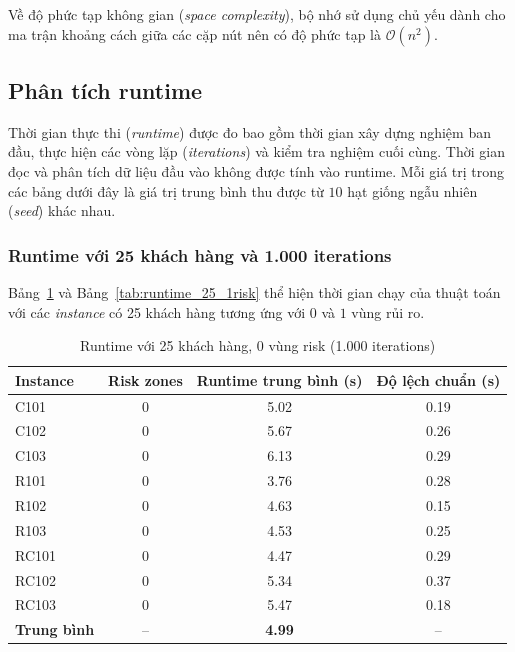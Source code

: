 \documentclass{article}
\begin{document}
Về độ phức tạp không gian (\textit{space complexity}), bộ nhớ sử dụng chủ yếu dành cho ma trận khoảng cách giữa các cặp nút nên có độ phức tạp là $\mathcal{O}(n^2)$.
\subsection{Phân tích runtime}

Thời gian thực thi (\textit{runtime}) được đo bao gồm thời gian xây dựng nghiệm ban đầu, thực hiện các vòng lặp (\textit{iterations}) và kiểm tra nghiệm cuối cùng. Thời gian đọc và phân tích dữ liệu đầu vào không được tính vào runtime. Mỗi giá trị trong các bảng dưới đây là giá trị trung bình thu được từ $10$ hạt giống ngẫu nhiên (\textit{seed}) khác nhau.

\subsubsection{Runtime với 25 khách hàng và 1.000 iterations}

Bảng~\ref{tab:runtime_25_0risk} và Bảng~\ref{tab:runtime_25_1risk} thể hiện thời gian chạy của thuật toán với các \textit{instance} có 25 khách hàng tương ứng với $0$ và $1$ vùng rủi ro.

\begin{table}[htbp]
    \centering
    \caption{Runtime với 25 khách hàng, 0 vùng risk (1.000 iterations)}
    \label{tab:runtime_25_0risk}
    \begin{tabular}{|l|c|c|c|}
        \hline
        \textbf{Instance} & \textbf{Risk zones} & \textbf{Runtime trung bình (s)} & \textbf{Độ lệch chuẩn (s)} \\ \hline
        C101 & 0 & 5.02 & 0.19 \\ \hline
        C102 & 0 & 5.67 & 0.26 \\ \hline
        C103 & 0 & 6.13 & 0.29 \\ \hline
        R101 & 0 & 3.76 & 0.28 \\ \hline
        R102 & 0 & 4.63 & 0.15 \\ \hline
        R103 & 0 & 4.53 & 0.25 \\ \hline
        RC101 & 0 & 4.47 & 0.29 \\ \hline
        RC102 & 0 & 5.34 & 0.37 \\ \hline
        RC103 & 0 & 5.47 & 0.18 \\ \hline
        \textbf{Trung bình} & -- & \textbf{4.99} & -- \\ \hline
    \end{tabular}
\end{table}
\end{document}
